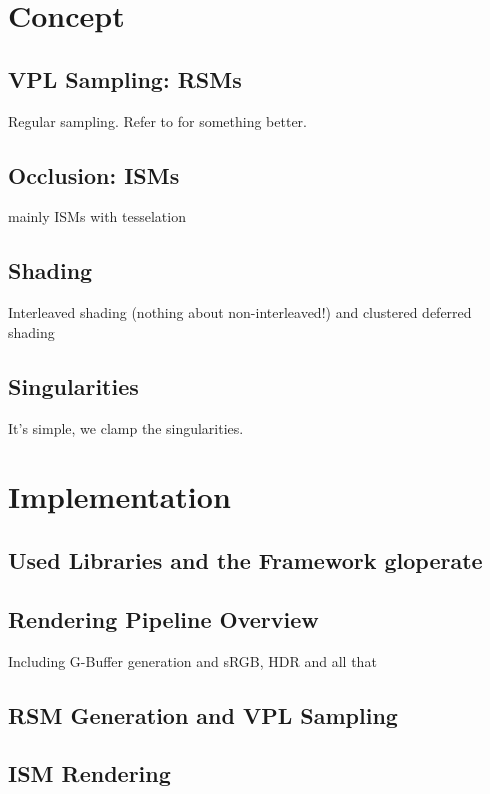 
\chapter{Concept}

\section{VPL Sampling: RSMs}
Regular sampling. Refer to \citep{hedman2016sequential} for something better.

\section{Occlusion: ISMs}
mainly ISMs \citep{ritschel2008ism} with tesselation \citep{barak2013temporally}

\section{Shading}
Interleaved shading \citep{Keller:2001:Interleaved} (nothing about non-interleaved!) and clustered deferred shading \citep{olsson2012clustered}

\section{Singularities}
It's simple, we clamp the singularities.



\chapter{Implementation}

\section{Used Libraries and the Framework gloperate}

\section{Rendering Pipeline Overview}
Including G-Buffer generation and sRGB, HDR and all that

\section{RSM Generation and VPL Sampling}

\section{ISM Rendering}

